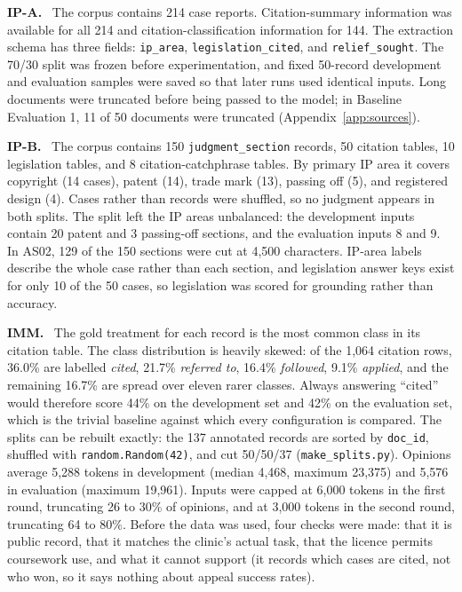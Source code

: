 \documentclass[10pt,letterpaper]{article}
\newcommand{\para}[1]{\textbf{#1}\ }
\newcommand{\code}[1]{\texttt{\small #1}}
\begin{document}
\para{IP-A.} The corpus contains 214 case reports. Citation-summary information was available for all 214 and citation-classification information for 144. The extraction schema has three fields: \code{ip\_area}, \code{legislation\_cited}, and \code{relief\_sought}. The 70/30 split was frozen before experimentation, and fixed 50-record development and evaluation samples were saved so that later runs used identical inputs. Long documents were truncated before being passed to the model; in Baseline Evaluation 1, 11 of 50 documents were truncated (Appendix~\ref{app:sources}).

\para{IP-B.} The corpus contains 150 \code{judgment\_section} records, 50 citation tables, 10 legislation tables, and 8 citation-catchphrase tables. By primary IP area it covers copyright (14 cases), patent (14), trade mark (13), passing off (5), and registered design (4). Cases rather than records were shuffled, so no judgment appears in both splits. The split left the IP areas unbalanced: the development inputs contain 20 patent and 3 passing-off sections, and the evaluation inputs 8 and 9. In AS02, 129 of the 150 sections were cut at 4,500 characters. IP-area labels describe the whole case rather than each section, and legislation answer keys exist for only 10 of the 50 cases, so legislation was scored for grounding rather than accuracy.

\para{IMM.} The gold treatment for each record is the most common class in its citation table. The class distribution is heavily skewed: of the 1,064 citation rows, 36.0\% are labelled \emph{cited}, 21.7\% \emph{referred to}, 16.4\% \emph{followed}, 9.1\% \emph{applied}, and the remaining 16.7\% are spread over eleven rarer classes. Always answering ``cited'' would therefore score 44\% on the development set and 42\% on the evaluation set, which is the trivial baseline against which every configuration is compared. The splits can be rebuilt exactly: the 137 annotated records are sorted by \code{doc\_id}, shuffled with \code{random.Random(42)}, and cut 50/50/37 (\code{make\_splits.py}). Opinions average 5,288 tokens in development (median 4,468, maximum 23,375) and 5,576 in evaluation (maximum 19,961). Inputs were capped at 6,000 tokens in the first round, truncating 26 to 30\% of opinions, and at 3,000 tokens in the second round, truncating 64 to 80\%. Before the data was used, four checks were made: that it is public record, that it matches the clinic's actual task, that the licence permits coursework use, and what it cannot support (it records which cases are cited, not who won, so it says nothing about appeal success rates).
\end{document}
